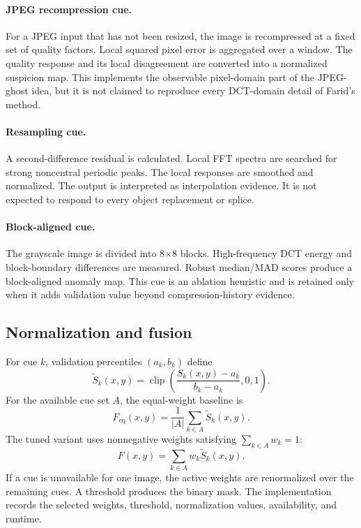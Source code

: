 \documentclass[sigconf,nonacm]{acmart}
\begin{document}
\paragraph{JPEG recompression cue.} For a JPEG input that has not been resized, the image is recompressed at a fixed set of quality factors. Local squared pixel error is aggregated over a window. The quality response and its local disagreement are converted into a normalized suspicion map. This implements the observable pixel-domain part of the JPEG-ghost idea, but it is not claimed to reproduce every DCT-domain detail of Farid's method.

\paragraph{Resampling cue.} A second-difference residual is calculated. Local FFT spectra are searched for strong noncentral periodic peaks. The local responses are smoothed and normalized. The output is interpreted as interpolation evidence. It is not expected to respond to every object replacement or splice.

\paragraph{Block-aligned cue.} The grayscale image is divided into 8$\times$8 blocks. High-frequency DCT energy and block-boundary differences are measured. Robust median/MAD scores produce a block-aligned anomaly map. This cue is an ablation heuristic and is retained only when it adds validation value beyond compression-history evidence.

\subsection{Normalization and fusion}
For cue $k$, validation percentiles $(a_k,b_k)$ define
\begin{equation}
  \widetilde{S}_k(x,y)=\operatorname{clip}\left(\frac{S_k(x,y)-a_k}{b_k-a_k},0,1\right).
\end{equation}
For the available cue set $A$, the equal-weight baseline is
\begin{equation}
  F_{\mathrm{eq}}(x,y)=\frac{1}{|A|}\sum_{k\in A}\widetilde{S}_k(x,y).
\end{equation}
The tuned variant uses nonnegative weights satisfying $\sum_{k\in A}w_k=1$:
\begin{equation}
  F(x,y)=\sum_{k\in A}w_k\widetilde{S}_k(x,y).
\end{equation}
If a cue is unavailable for one image, the active weights are renormalized over the remaining cues. A threshold produces the binary mask. The implementation records the selected weights, threshold, normalization values, availability, and runtime.
\end{document}
